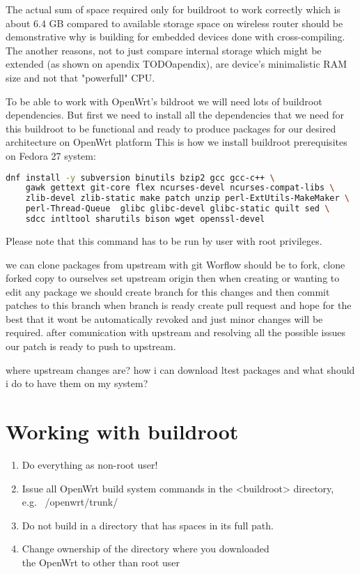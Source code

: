 The actual sum of space required only for buildroot to work correctly which is about 6.4 GB compared to available storage space on wireless router should be demonstrative why is building for embedded devices done with cross-compiling.
The another reasons, not to just compare internal storage which might be extended (as shown on apendix TODOapendix), are device's minimalistic RAM size and not that "powerfull" CPU.

To be able to work with OpenWrt's bildroot we will need lots of buildroot dependencies.
But first we need to install all the dependencies that we need for this buildroot to be functional and ready to produce packages for our desired architecture on OpenWrt platform
This is how we install buildroot prerequisites on Fedora 27 system:

\begin{lstlisting}[language=bash,basicstyle=\ttfamily\footnotesize,label=fedora-install,caption=Prerequisites installation on Fedora 27]
    dnf install -y subversion binutils bzip2 gcc gcc-c++ \
    gawk gettext git-core flex ncurses-devel ncurses-compat-libs \
    zlib-devel zlib-static make patch unzip perl-ExtUtils-MakeMaker \
    perl-Thread-Queue  glibc glibc-devel glibc-static quilt sed \
    sdcc intltool sharutils bison wget openssl-devel
\end{lstlisting}

Please note that this command has to be run by user with root privileges.

we can clone packages from upstream with git Worflow should be to fork, clone forked copy to ourselves set upstream origin then when creating or wanting to edit any package we should create branch for this changes and then commit patches to this branch
when branch is ready create pull request and hope for the best that it wont be automatically revoked and just minor changes will be required.
after comunication with upstream and resolving all the possible issues our patch is ready to push to upstream.

where upstream changes are? how i can download ltest packages and what should i do to have them on my system?

\section{Working with buildroot} \label{working-with-buildroot} \todo{!!!!!!!!!!!!!!!!!!!!!!!!!!}
\begin{enumerate}
    \item Do everything as non-root user!
    \item Issue all OpenWrt build system commands in the <buildroot> directory, \\e.g. ~/openwrt/trunk/
    \item Do not build in a directory that has spaces in its full path.
    \item Change ownership of the directory where you downloaded \\the OpenWrt to other than root user
\end{enumerate}

